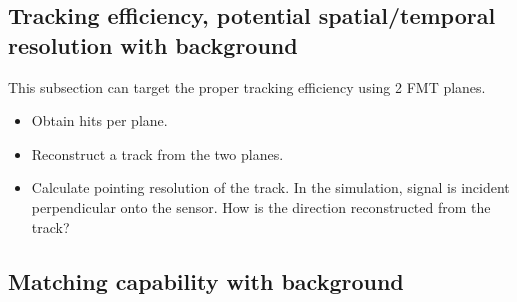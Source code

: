 \subsection{Tracking efficiency, potential spatial/temporal resolution with background}
This subsection can target the proper tracking efficiency using 2 FMT planes.
\begin{itemize}
    \item Obtain hits per plane.
    \item Reconstruct a track from the two planes.
    \item Calculate pointing resolution of the track. In the simulation, signal is incident perpendicular onto the sensor. How is the direction reconstructed from the track?
\end{itemize}

\subsection{Matching capability with background}